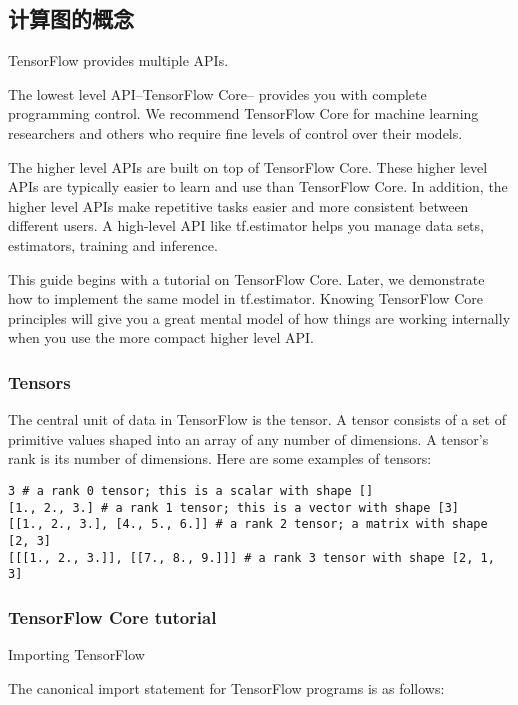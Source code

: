 \documentclass[10pt,a4paper]{ctexbook}
\begin{document}
\subsection{计算图的概念}
TensorFlow provides multiple APIs.

The lowest level API--TensorFlow Core-- provides you with complete programming control. We recommend TensorFlow Core for machine learning researchers and others who require fine levels of control over their models.

The higher level APIs are built on top of TensorFlow Core. These higher level APIs are typically easier to learn and use than TensorFlow Core. In addition, the higher level APIs make repetitive tasks easier and more consistent between different users. A high-level API like tf.estimator helps you manage data sets, estimators, training and inference.

This guide begins with a tutorial on TensorFlow Core. Later, we demonstrate how to implement the same model in tf.estimator. Knowing TensorFlow Core principles will give you a great mental model of how things are working internally when you use the more compact higher level API.

\subsubsection{Tensors}
The central unit of data in TensorFlow is the tensor. A tensor consists of a set of primitive values shaped into an array of any number of dimensions. A tensor's rank is its number of dimensions. Here are some examples of tensors:

\begin{verbatim}
3 # a rank 0 tensor; this is a scalar with shape []
[1., 2., 3.] # a rank 1 tensor; this is a vector with shape [3]
[[1., 2., 3.], [4., 5., 6.]] # a rank 2 tensor; a matrix with shape [2, 3]
[[[1., 2., 3.]], [[7., 8., 9.]]] # a rank 3 tensor with shape [2, 1, 3]
\end{verbatim}


\subsubsection{TensorFlow Core tutorial}

Importing TensorFlow

The canonical import statement for TensorFlow programs is as follows:
\end{document}
